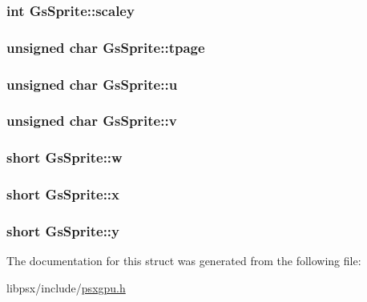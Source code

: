 \subsubsection[{scaley}]{\setlength{\rightskip}{0pt plus 5cm}int Gs\+Sprite\+::scaley}\label{structGsSprite_a27d5b483b9d62b6cec1dd386762a1b04}
\hypertarget{structGsSprite_ad29755b3e340cdb63658e3ba9f18ee34}{}
\subsubsection[{tpage}]{\setlength{\rightskip}{0pt plus 5cm}unsigned char Gs\+Sprite\+::tpage}\label{structGsSprite_ad29755b3e340cdb63658e3ba9f18ee34}
\hypertarget{structGsSprite_aab15a5e9d8e1e725b9a73055191efba4}{}
\subsubsection[{u}]{\setlength{\rightskip}{0pt plus 5cm}unsigned char Gs\+Sprite\+::u}\label{structGsSprite_aab15a5e9d8e1e725b9a73055191efba4}
\hypertarget{structGsSprite_a56bd7e047d09ffe30f420820c3b76f51}{}
\subsubsection[{v}]{\setlength{\rightskip}{0pt plus 5cm}unsigned char Gs\+Sprite\+::v}\label{structGsSprite_a56bd7e047d09ffe30f420820c3b76f51}
\hypertarget{structGsSprite_ab5336006a83518fd31c54107de9dbc18}{}
\subsubsection[{w}]{\setlength{\rightskip}{0pt plus 5cm}short Gs\+Sprite\+::w}\label{structGsSprite_ab5336006a83518fd31c54107de9dbc18}
\hypertarget{structGsSprite_a1c067283cdc61f263e5b7e45ff714d4d}{}
\subsubsection[{x}]{\setlength{\rightskip}{0pt plus 5cm}short Gs\+Sprite\+::x}\label{structGsSprite_a1c067283cdc61f263e5b7e45ff714d4d}
\hypertarget{structGsSprite_af747b4473fd4a9616a2da218cf313c61}{}
\subsubsection[{y}]{\setlength{\rightskip}{0pt plus 5cm}short Gs\+Sprite\+::y}\label{structGsSprite_af747b4473fd4a9616a2da218cf313c61}


The documentation for this struct was generated from the following file\+:\begin{DoxyCompactItemize}
\item 
libpsx/include/\hyperlink{psxgpu_8h}{psxgpu.\+h}\end{DoxyCompactItemize}
